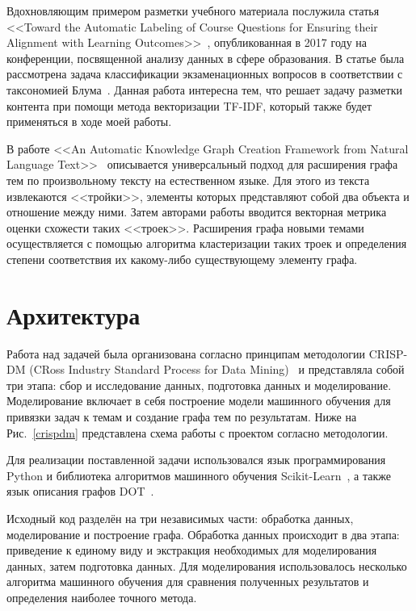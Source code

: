 \documentclass[14pt]{matmex-diploma-custom}
\begin{document}
Вдохновляющим примером разметки учебного материала послужила статья <<Toward the Automatic Labeling of Course Questions for
Ensuring their Alignment with Learning Outcomes>>~\cite{paper44}, опубликованная в 2017 году на конференции, посвященной анализу данных в сфере образования. В статье была рассмотрена задача классификации экзаменационных вопросов в соответствии с таксономией Блума~\cite{bloom}. Данная работа интересна тем, что решает задачу разметки контента при помощи метода векторизации TF-IDF, который также будет применяться в ходе моей работы.

В работе <<An Automatic Knowledge Graph Creation Framework from
Natural Language Text>>~\cite{autograph} описывается универсальный подход для расширения графа тем по произвольному тексту на естественном языке. Для этого из текста извлекаются <<тройки>>, элементы которых представляют собой два объекта и отношение между ними. Затем авторами работы вводится векторная метрика оценки схожести таких <<троек>>. Расширения графа новыми темами осуществляется с помощью алгоритма кластеризации таких троек и определения степени соответствия их какому-либо существующему элементу графа.

\section{Архитектура}

Работа над задачей была организована согласно принципам методологии CRISP-DM (CRoss Industry Standard Process for Data Mining)~\cite{crispdm} и представляла собой три этапа: сбор и исследование данных, подготовка данных и моделирование. Моделирование включает в себя построение модели машинного обучения для привязки задач к темам и создание графа тем по результатам. Ниже на Рис.~\ref{crispdm} представлена схема работы с проектом согласно методологии.

Для реализации поставленной задачи использовался язык программирования Python и библиотека алгоритмов машинного обучения Scikit-Learn~\cite{sklearn}, а также язык описания графов DOT~\cite{dot}.

Исходный код разделён на три независимых части: обработка данных, моделирование и построение графа. Обработка данных происходит в два этапа: приведение к единому виду и экстракция необходимых для моделирования данных, затем подготовка данных. Для моделирования использовалось несколько алгоритма машинного обучения для сравнения полученных результатов и определения наиболее точного метода.
\end{document}

